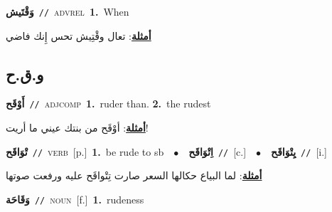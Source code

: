 \documentclass[10pt,a4paper,twoside]{article} %
\begin{document}
\begin{multicols}{2}
{\setlength\topsep{0pt}\textbf{\foreignlanguage{arabic}{وَقْتَيش}}\ {\color{gray}\texttt{//}\color{black}}\ \textsc{adv\textunderscore rel}\ \textbf{1.}~When\  \begin{flushright}\color{gray}\foreignlanguage{arabic}{\textbf{\underline{\foreignlanguage{arabic}{أمثلة}}}: تعال وقْتِيش تحس إِنك فاضي}\end{flushright}\color{black}} \vspace{2mm}

\vspace{-3mm}
\subsection*{\color{blue}\foreignlanguage{arabic}{و.ق.ح}\color{blue}{}} 

{\setlength\topsep{0pt}\textbf{\foreignlanguage{arabic}{أَوْقَح}}\ {\color{gray}\texttt{//}\color{black}}\ \textsc{adj\textunderscore comp}\ \textbf{1.}~ruder than.  \textbf{2.}~the rudest\  \begin{flushright}\color{gray}\foreignlanguage{arabic}{\textbf{\underline{\foreignlanguage{arabic}{أمثلة}}}: أوْقَح من بنتك عيني ما أريت!}\end{flushright}\color{black}} \vspace{2mm}

{\setlength\topsep{0pt}\textbf{\foreignlanguage{arabic}{تْوَاقَح}}\ {\color{gray}\texttt{//}\color{black}}\ \textsc{verb}\ [p.]\ \textbf{1.}~be rude to sb\ \ $\bullet$\ \ \setlength\topsep{0pt}\textbf{\foreignlanguage{arabic}{اِتْوَاقَح}}\ {\color{gray}\texttt{//}\color{black}}\ [c.]\ \ $\bullet$\ \ \setlength\topsep{0pt}\textbf{\foreignlanguage{arabic}{يِتْوَاقَح}}\ {\color{gray}\texttt{//}\color{black}}\ [i.]\  \begin{flushright}\color{gray}\foreignlanguage{arabic}{\textbf{\underline{\foreignlanguage{arabic}{أمثلة}}}: لما البياع حكالها السعر صارت تِتْواقَح عليه ورفعت صوتها}\end{flushright}\color{black}} \vspace{2mm}

{\setlength\topsep{0pt}\textbf{\foreignlanguage{arabic}{وَقَاحَة}}\ {\color{gray}\texttt{//}\color{black}}\ \textsc{noun}\ [f.]\ \textbf{1.}~rudeness\ } \vspace{2mm}


\end{multicols}
\end{document}
